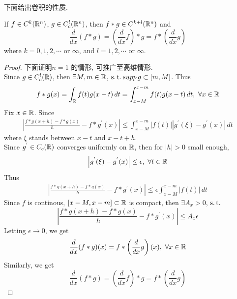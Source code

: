 	\vspace{4em}
	
	下面给出卷积的性质. 
	\begin{proposition}\label{prop A.5.1}
		If $f \in C^{k}(\mathbb{R}^n)$, $g \in C_{c}^{l}(\mathbb{R}^n)$, then $f * g \in C^{k + l}(\mathbb{R}^n)$ and
		\[ \frac{d}{dx}(f * g) = \left( \frac{d}{dx} f \right) * g = f * \left( \frac{d}{dx} g \right) \]
		where $k = 0 , 1 , 2 , \cdots$ or $\infty$, and $l = 1 , 2 , \cdots$ or $\infty$.
		
		\vspace{6em}
		
		\begin{proof}
			下面证明$n = 1$ 的情形, 可推广至高维情形. \\
			Since $g \in C_{c}^{l}(\mathbb{R})$, then $\exists M , m \in \mathbb{R}$, $\operatorname{s.t.} supp \, g \subset [m , M]$. Thus
			\[ f*g (x) 
			= \int_{\mathbb{R}} f(t) g(x - t) \, dt 
			= \int_{x - M}^{x - m} f(t) g(x - t) \, dt , \,\, \forall x \in \mathbb{R} \]
			Fix $x \in \mathbb{R}$. Since
			\begin{align}
				\left| \frac{f*g (x + h) - f*g(x)}{h} - f* g^{'}(x) \right| 
				\leq \int_{x - M}^{x - m} \left| f(t) \right| \left| g^{'}(\xi) - g^{'}(x) \right| \, dt
			\end{align}
			where $\xi$ stands between $x - t$ and $x - t + h$. \\
			Since $g^{'} \in C_{c}(\mathbb{R})$ converges uniformly on $\mathbb{R}$, then for $\left| h \right| > 0$ small enough, 
			\[ \left| g^{'}(\xi) - g^{'}(x) \right| \leq \epsilon , \,\, \forall t \in \mathbb{R} \]
			Thus
			\begin{align}
				\left| \frac{f*g (x + h) - f*g(x)}{h} - f* g^{'}(x) \right| 
				\leq \epsilon \int_{x - M}^{x - m} \left| f(t) \right| \, dt
			\end{align}
			Since $f$ is continous, $[x - M , x - m] \subset \mathbb{R}$ is compact, then $\exists A_x > 0$, $\operatorname{s.t.}$
			\[ \left| \frac{f*g (x + h) - f*g(x)}{h} - f* g^{'}(x) \right| \leq A_x \epsilon \]
			Letting $\epsilon \to 0$, we get
			\[ \frac{d}{dx}(f * g)(x) = f * \left( \frac{d}{dx} g \right) (x) , \,\, \forall x \in \mathbb{R}  \]
			Similarly, we get
			\[ \frac{d}{dx}(f * g) = \left( \frac{d}{dx} f \right) * g = f * \left( \frac{d}{dx} g \right) \]
		\end{proof}
	\end{proposition}
	
	







	\ifx\allfiles\undefined

\fi